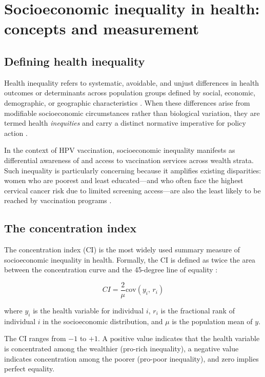 \section{Socioeconomic inequality in health: concepts and measurement}

\subsection{Defining health inequality}

Health inequality refers to systematic, avoidable, and unjust differences in health outcomes or determinants across population groups defined by social, economic, demographic, or geographic characteristics \cite{whitehead1991}. When these differences arise from modifiable socioeconomic circumstances rather than biological variation, they are termed health \textit{inequities} and carry a distinct normative imperative for policy action \cite{braveman2006}.

In the context of HPV vaccination, socioeconomic inequality manifests as differential awareness of and access to vaccination services across wealth strata. Such inequality is particularly concerning because it amplifies existing disparities: women who are poorest and least educated---and who often face the highest cervical cancer risk due to limited screening access---are also the least likely to be reached by vaccination programs \cite{paul2020}.

\subsection{The concentration index}

The concentration index (CI) is the most widely used summary measure of socioeconomic inequality in health. Formally, the CI is defined as twice the area between the concentration curve and the 45-degree line of equality \cite{wagstaff2000}:

\begin{equation}
CI = \frac{2}{\mu} \mathrm{cov}(y_i,\, r_i)
\label{eq:ci}
\end{equation}

\noindent where $y_i$ is the health variable for individual $i$, $r_i$ is the fractional rank of individual $i$ in the socioeconomic distribution, and $\mu$ is the population mean of $y$.

The CI ranges from $-1$ to $+1$. A positive value indicates that the health variable is concentrated among the wealthier (pro-rich inequality), a negative value indicates concentration among the poorer (pro-poor inequality), and zero implies perfect equality.

